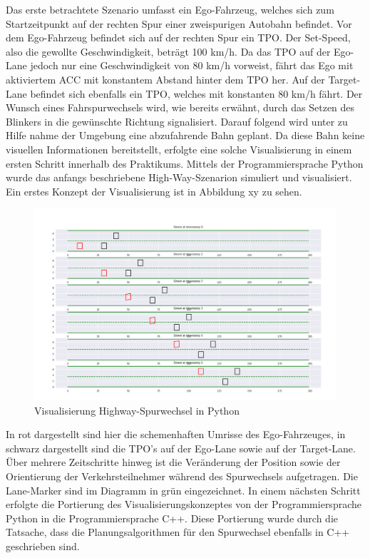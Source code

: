 Das erste betrachtete Szenario umfasst ein Ego-Fahrzeug, welches sich zum Startzeitpunkt auf der rechten Spur einer zweispurigen Autobahn befindet. Vor dem Ego-Fahrzeug befindet sich auf der rechten Spur ein TPO. Der Set-Speed, also die gewollte Geschwindigkeit, beträgt 100 km/h. Da das TPO auf der Ego-Lane jedoch nur eine Geschwindigkeit von 80 km/h vorweist, fährt das Ego mit aktiviertem ACC mit konstantem Abstand hinter dem TPO her. Auf der Target-Lane befindet sich ebenfalls ein TPO, welches mit konstanten 80 km/h fährt. Der Wunsch eines Fahrspurwechsels wird, wie bereits erwähnt, durch das Setzen des Blinkers in die gewünschte Richtung signalisiert. Darauf folgend wird unter zu Hilfe nahme der Umgebung eine abzufahrende Bahn geplant. Da diese Bahn keine visuellen Informationen bereitstellt, erfolgte eine solche Visualisierung in einem ersten Schritt innerhalb des Praktikums. Mittels der Programmiersprache Python wurde das anfangs beschriebene High-Way-Szenarion simuliert und visualisiert. Ein erstes Konzept der Visualisierung ist in Abbildung xy zu sehen. 

\begin{figure}[!ht]
	\begin{center}
		\includegraphics[width=1.0\linewidth]{Abbildungen/bericht/lanechange_visualization}
		\caption{Visualisierung Highway-Spurwechsel in Python}
		\label{fig.highway_spurwechsel_python}
	\end{center}
\end{figure} 

In rot dargestellt sind hier die schemenhaften Umrisse des Ego-Fahrzeuges, in schwarz dargestellt sind die TPO's auf der Ego-Lane sowie auf der Target-Lane. Über mehrere Zeitschritte hinweg ist die Veränderung der Position sowie der Orientierung der Verkehrsteilnehmer während des Spurwechsels aufgetragen. Die Lane-Marker sind im Diagramm in grün eingezeichnet. 
In einem nächsten Schritt erfolgte die Portierung des Visualisierungskonzeptes von der Programmiersprache Python in die Programmiersprache C++. Diese Portierung wurde durch die Tatsache, dass die Planungsalgorithmen für den Spurwechsel ebenfalls in C++ geschrieben sind.

